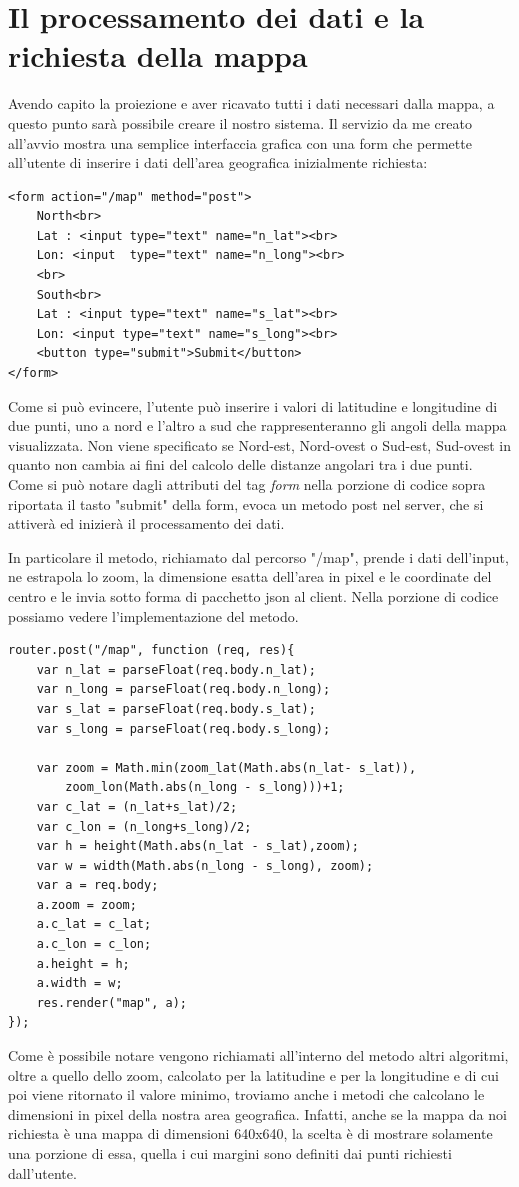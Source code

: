\section{Il processamento dei dati e la richiesta della mappa}
Avendo capito la proiezione e aver ricavato tutti i dati necessari dalla mappa, a questo punto sarà possibile creare il nostro sistema. Il servizio da me creato all'avvio mostra una semplice interfaccia grafica con una form che permette all'utente di inserire i dati dell'area geografica inizialmente richiesta:
\begin{lstlisting}
<form action="/map" method="post">
    North<br>
    Lat : <input type="text" name="n_lat"><br>
    Lon: <input  type="text" name="n_long"><br>
    <br>
    South<br>
    Lat : <input type="text" name="s_lat"><br>
    Lon: <input type="text" name="s_long"><br>
    <button type="submit">Submit</button>
</form>
\end{lstlisting}
Come si può evincere, l'utente può inserire i valori di latitudine e longitudine di due punti, uno a nord e l'altro a sud che rappresenteranno gli angoli della mappa visualizzata. Non viene specificato se Nord-est, Nord-ovest o Sud-est, Sud-ovest in quanto non cambia ai fini del calcolo delle distanze angolari tra i due punti. Come si può notare dagli attributi del tag \textit{form} nella porzione di codice sopra riportata il tasto "submit" della form, evoca un metodo post nel server, che si attiverà ed inizierà il processamento dei dati.

In particolare il metodo, richiamato dal percorso "/map", prende i dati dell'input, ne estrapola lo zoom, la dimensione esatta dell'area in pixel e le coordinate del centro e le invia sotto forma di pacchetto json al client. Nella porzione di codice possiamo vedere l'implementazione del metodo.
\begin{verbatim}
router.post("/map", function (req, res){
    var n_lat = parseFloat(req.body.n_lat);
    var n_long = parseFloat(req.body.n_long);
    var s_lat = parseFloat(req.body.s_lat);
    var s_long = parseFloat(req.body.s_long);

    var zoom = Math.min(zoom_lat(Math.abs(n_lat- s_lat)),
        zoom_lon(Math.abs(n_long - s_long)))+1;
    var c_lat = (n_lat+s_lat)/2;
    var c_lon = (n_long+s_long)/2;
    var h = height(Math.abs(n_lat - s_lat),zoom);
    var w = width(Math.abs(n_long - s_long), zoom);
    var a = req.body;
    a.zoom = zoom;
    a.c_lat = c_lat;
    a.c_lon = c_lon;
    a.height = h;
    a.width = w;
    res.render("map", a);
});
\end{verbatim}
Come è possibile notare vengono richiamati all'interno del metodo altri algoritmi, oltre a quello dello zoom, calcolato per la latitudine e per la longitudine e di cui poi viene ritornato il valore minimo, troviamo anche i metodi che calcolano le dimensioni in pixel della nostra area geografica. Infatti, anche se la mappa da noi richiesta è una mappa di dimensioni 640x640, la scelta è di mostrare solamente una porzione di essa, quella i cui margini sono definiti dai punti richiesti dall'utente.

